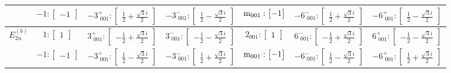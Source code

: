 \documentclass[fleqn,8pt,landscape]{jsarticle}
\begin{document}
\begin{longtable}{ccccccc}
& $ -1:\begin{bmatrix} -1 \end{bmatrix} $ & $ -3^{+}_{\,\,001}:\begin{bmatrix} \frac{1}{2} + \frac{\sqrt{3} i}{2} \end{bmatrix} $ & $ -3^{-}_{\,\,001}:\begin{bmatrix} \frac{1}{2} - \frac{\sqrt{3} i}{2} \end{bmatrix} $ & $ {\rm m}_{001}:\begin{bmatrix} -1 \end{bmatrix} $ & $ -6^{-}_{\,\,001}:\begin{bmatrix} \frac{1}{2} + \frac{\sqrt{3} i}{2} \end{bmatrix} $ & $ -6^{+}_{\,\,001}:\begin{bmatrix} \frac{1}{2} - \frac{\sqrt{3} i}{2} \end{bmatrix} $ \\ \hline
$ E_{2u}^{(b)} $ & $ 1:\begin{bmatrix} 1 \end{bmatrix} $ & $ 3^{+}_{\,\,001}:\begin{bmatrix} - \frac{1}{2} + \frac{\sqrt{3} i}{2} \end{bmatrix} $ & $ 3^{-}_{\,\,001}:\begin{bmatrix} - \frac{1}{2} - \frac{\sqrt{3} i}{2} \end{bmatrix} $ & $ 2{}_{001}:\begin{bmatrix} 1 \end{bmatrix} $ & $ 6^{-}_{\,\,001}:\begin{bmatrix} - \frac{1}{2} + \frac{\sqrt{3} i}{2} \end{bmatrix} $ & $ 6^{+}_{\,\,001}:\begin{bmatrix} - \frac{1}{2} - \frac{\sqrt{3} i}{2} \end{bmatrix} $ \\
& $ -1:\begin{bmatrix} -1 \end{bmatrix} $ & $ -3^{+}_{\,\,001}:\begin{bmatrix} \frac{1}{2} - \frac{\sqrt{3} i}{2} \end{bmatrix} $ & $ -3^{-}_{\,\,001}:\begin{bmatrix} \frac{1}{2} + \frac{\sqrt{3} i}{2} \end{bmatrix} $ & $ {\rm m}_{001}:\begin{bmatrix} -1 \end{bmatrix} $ & $ -6^{-}_{\,\,001}:\begin{bmatrix} \frac{1}{2} - \frac{\sqrt{3} i}{2} \end{bmatrix} $ & $ -6^{+}_{\,\,001}:\begin{bmatrix} \frac{1}{2} + \frac{\sqrt{3} i}{2} \end{bmatrix} $ \\
\end{longtable}
\end{document}

